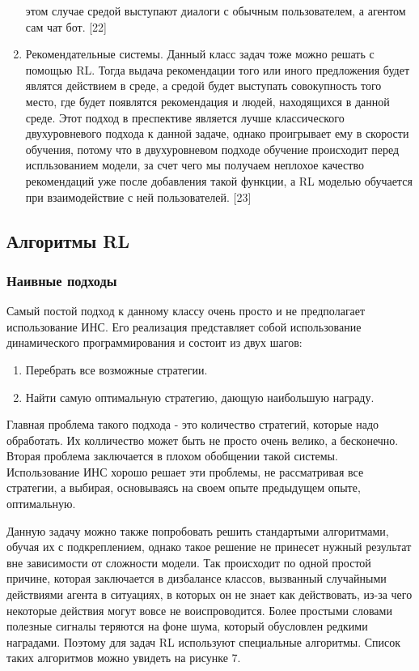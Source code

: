 \documentclass[bachelor, och, coursework]{shiza}
\begin{document}
\begin{enumerate}
    этом случае средой выступают диалоги с обычным пользователем, а агентом сам чат бот. [22]
    \item Рекомендательные системы. Данный класс задач тоже можно решать с помощью RL. Тогда выдача рекомендации того или иного предложения будет являтся действием в среде,
    а средой будет выступать совокупность того место, где будет появлятся рекомендация и людей, находящихся в данной среде. Этот подход в преспективе является лучше
    классического двухуровневого подхода к данной задаче, однако проигрывает ему в скорости обучения, потому что в двухуровневом подходе обучение происходит
    перед испльзованием модели, за счет чего мы получаем неплохое качество рекомендаций уже после добавления такой функции, а RL моделью обучается при 
    взаимодействие с ней пользователей. [23]
\end{enumerate}

\subsection{Алгоритмы RL}
\subsubsection{Наивные подходы}
Самый постой подход к данному классу очень просто и не предполагает использование ИНС. Его реализация представляет собой использование динамического программирования и
состоит из двух шагов:
\begin{enumerate}
    \item Перебрать все возможные стратегии.
    \item Найти самую оптимальную стратегию, дающую наибольшую награду.
\end{enumerate}
Главная проблема такого подхода - это количество стратегий, которые надо обработать. Их колличество может быть не просто очень велико, а бесконечно. Вторая проблема
заключается в плохом обобщении такой системы. Использование ИНС хорошо решает эти проблемы, не рассматривая все стратегии, а выбирая, основываясь на своем опыте
предыдущем опыте, оптимальную.

Данную задачу можно также попробовать решить стандартыми алгоритмами, обучая их с подкреплением, однако такое решение не принесет нужный результат вне зависимости от сложности модели.
Так происходит по одной простой причине, которая заключается в дизбалансе классов, вызванный случайными действиями агента в ситуациях, в которых он не знает как действовать,
из-за чего некоторые действия могут вовсе не воиспроводится. Более простыми словами полезные сигналы теряются на фоне шума, который обусловлен редкими наградами. Поэтому для
задач RL используют специальные алгоритмы. Список таких алгоритмов можно увидеть на рисунке 7.
\end{document}
